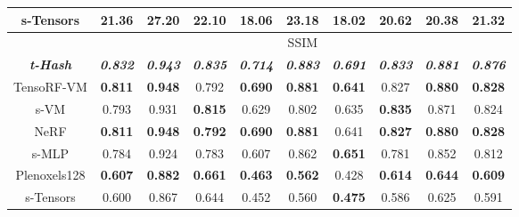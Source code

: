 \documentclass[letterpaper]{article} \usepackage{aaai23}  \usepackage{times}  \usepackage{helvet}  \usepackage{courier}  \usepackage[hyphens]{url}  \usepackage{graphicx} \urlstyle{rm} \def\UrlFont{\rm}  \usepackage{natbib}  \usepackage{caption} \frenchspacing  \setlength{\pdfpagewidth}{8.5in}  \setlength{\pdfpageheight}{11in}  \usepackage{multirow}
\begin{document}
\begin{table*}[t]
{\begin{tabular}{c|ccccccccc}
s-Tensors                & 21.36                   & 27.20                   & 22.10                   & 18.06                   & 23.18                   & \textbf{18.02}          & 20.62                   & 20.38                   & 21.32                   \\ \hline
                         & \multicolumn{9}{c}{SSIM}                                                                                                                                                                                                                \\ \hline
\textit{\textbf{t-Hash}} & \textit{\textbf{0.832}} & \textit{\textbf{0.943}} & \textit{\textbf{0.835}} & \textit{\textbf{0.714}} & \textit{\textbf{0.883}} & \textit{\textbf{0.691}} & \textit{\textbf{0.833}} & \textit{\textbf{0.881}} & \textit{\textbf{0.876}} \\
TensoRF-VM               & \textbf{0.811}          & \textbf{0.948}          & 0.792                   & \textbf{0.690}          & \textbf{0.881}          & \textbf{0.641}          & 0.827                   & \textbf{0.880}          & \textbf{0.828}          \\
s-VM                     & 0.793                   & 0.931                   & \textbf{0.815}          & 0.629                   & 0.802                   & 0.635                   & \textbf{0.835}          & 0.871                   & 0.824                   \\
NeRF                     & \textbf{0.811}          & \textbf{0.948}          & \textbf{0.792}          & \textbf{0.690}          & \textbf{0.881}          & 0.641                   & \textbf{0.827}          & \textbf{0.880}          & \textbf{0.828}          \\
s-MLP                    & 0.784                   & 0.924                   & 0.783                   & 0.607                   & 0.862                   & \textbf{0.651}          & 0.781                   & 0.852                   & 0.812                   \\
Plenoxels128             & \textbf{0.607}          & \textbf{0.882}          & \textbf{0.661}          & \textbf{0.463}          & \textbf{0.562}          & 0.428                   & \textbf{0.614}          & \textbf{0.644}          & \textbf{0.609}          \\
s-Tensors                & 0.600                   & 0.867                   & 0.644                   & 0.452                   & 0.560                   & \textbf{0.475}          & 0.586                   & 0.625                   & 0.591                   \\ \hline

\end{tabular}}
\end{table*}
\end{document}

